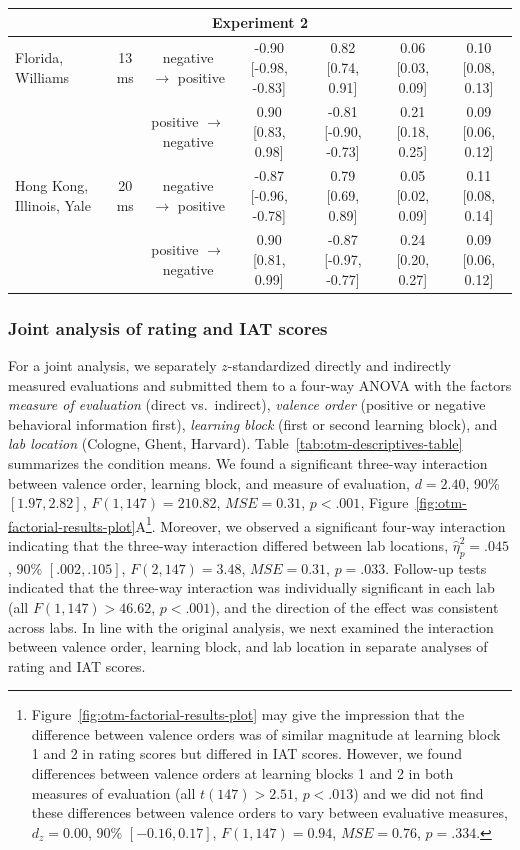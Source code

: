 \documentclass[
  man,floatsintext]{apa6}
\newenvironment{lltable}{\begin{landscape}\centering\begin{ThreePartTable}}{\end{ThreePartTable}\end{landscape}}
\begin{document}
\begin{lltable}
{\begin{longtable}{lcccccc}
\multicolumn{7}{c}{Experiment 2}\\ \midrule
Florida, Williams & 13 ms & negative $\to$ positive & -0.90 [-0.98, -0.83] & 0.82 [0.74, 0.91] & 0.06 [0.03, 0.09] & 0.10 [0.08, 0.13]\\
 &  & positive $\to$ negative & 0.90 [0.83, 0.98] & -0.81 [-0.90, -0.73] & 0.21 [0.18, 0.25] & 0.09 [0.06, 0.12]\\
Hong Kong, Illinois, Yale & 20 ms & negative $\to$ positive & -0.87 [-0.96, -0.78] & 0.79 [0.69, 0.89] & 0.05 [0.02, 0.09] & 0.11 [0.08, 0.14]\\
 &  & positive $\to$ negative & 0.90 [0.81, 0.99] & -0.87 [-0.97, -0.77] & 0.24 [0.20, 0.27] & 0.09 [0.06, 0.12]\\
\bottomrule
\end{longtable}

}

\end{lltable}

\hypertarget{joint-analysis-of-rating-and-iat-scores}{%
\subsubsection{Joint analysis of rating and IAT scores}\label{joint-analysis-of-rating-and-iat-scores}}

For a joint analysis, we separately \(z\)-standardized directly and indirectly measured evaluations and submitted them to a four-way ANOVA with the factors \emph{measure of evaluation} (direct vs.~indirect), \emph{valence order} (positive or negative behavioral information first), \emph{learning block} (first or second learning block), and \emph{lab location} (Cologne, Ghent, Harvard).
Table~\ref{tab:otm-descriptives-table} summarizes the condition means.
We found a significant three-way interaction between valence order, learning block, and measure of evaluation, \(d = 2.40\), 90\% \([1.97, 2.82]\), \(F(1, 147) = 210.82\), \(\mathit{MSE} = 0.31\), \(p < .001\), Figure~\ref{fig:otm-factorial-results-plot}A\footnote{Figure~\ref{fig:otm-factorial-results-plot} may give the impression that the difference between valence orders was of similar magnitude at learning block 1 and 2 in rating scores but differed in IAT scores.
  However, we found differences between valence orders at learning blocks 1 and 2 in both measures of evaluation (all \(t(147) > 2.51\), \(p < .013\)) and we did not find these differences between valence orders to vary between evaluative measures, \(d_z = 0.00\), 90\% \([-0.16, 0.17]\), \(F(1, 147) = 0.94\), \(\mathit{MSE} = 0.76\), \(p = .334\).}.
Moreover, we observed a significant four-way interaction indicating that the three-way interaction differed between lab locations, \(\hat\eta^2_p = .045\), 90\% \([.002, .105]\), \(F(2, 147) = 3.48\), \(\mathit{MSE} = 0.31\), \(p = .033\).
Follow-up tests indicated that the three-way interaction was individually significant in each lab (all \(F(1, 147) > 46.62\), \(p < .001\)), and the direction of the effect was consistent across labs.
In line with the original analysis, we next examined the interaction between valence order, learning block, and lab location in separate analyses of rating and IAT scores.
\end{document}
